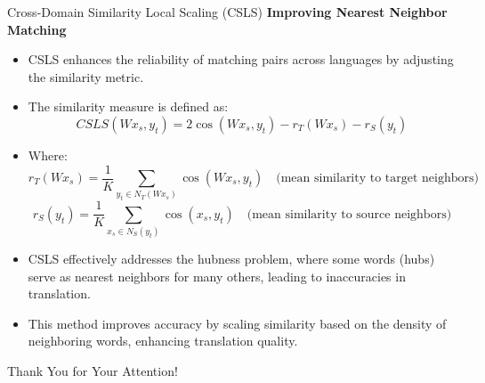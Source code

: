 \documentclass[]{beamer}
\begin{document}

\begin{frame}{Cross-Domain Similarity Local Scaling (CSLS)}
    \small
    \textbf{Improving Nearest Neighbor Matching}
    \begin{itemize}
        \item CSLS enhances the reliability of matching pairs across languages by adjusting the similarity metric.
        \item The similarity measure is defined as:
        \begin{equation}
            CSLS(W x_s, y_t) = 2 \cos(W x_s, y_t) - r_T(W x_s) - r_S(y_t)
        \end{equation}
        \item Where:
	\scriptsize
        \begin{equation}
            r_T(W x_s) = \frac{1}{K} \sum_{y_t \in N_T(W x_s)} \cos(W x_s, y_t) \quad \text{(mean similarity to target neighbors)}
	\end{equation}
	\begin{equation}
            r_S(y_t) = \frac{1}{K} \sum_{x_s \in N_S(y_t)} \cos(x_s, y_t) \quad \text{(mean similarity to source neighbors)}
        \end{equation}
	\small
        \item CSLS effectively addresses the hubness problem, where some words (hubs) serve as nearest neighbors for many others, leading to inaccuracies in translation.
        \item This method improves accuracy by scaling similarity based on the density of neighboring words, enhancing translation quality.
    \end{itemize}
\end{frame}






\begin{frame}[plain]
\vfill
\centerline{Thank You for Your Attention!}
\vfill
\end{frame}
\end{document}
